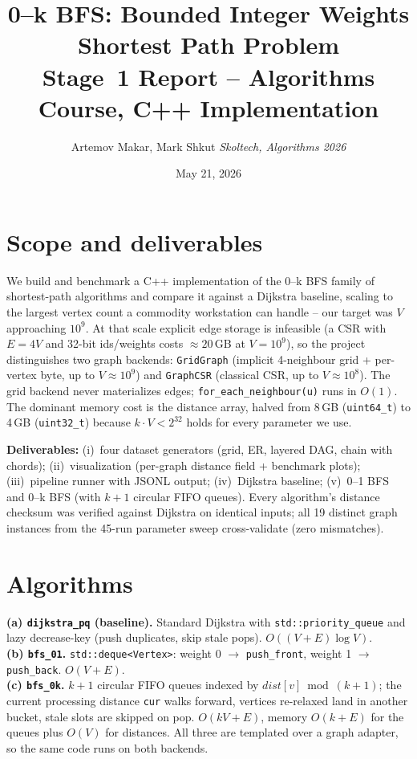\documentclass[11pt,a4paper]{article}
\title{\vspace{-2.3em}\textbf{0--k BFS: Bounded Integer Weights Shortest Path Problem}\\
\normalsize Stage~1 Report -- Algorithms Course, C++ Implementation}
\author{Artemov Makar, Mark Shkut \quad\textit{Skoltech, Algorithms 2026}}
\date{\vspace{-0.6em}May 21, 2026}
\begin{document}
\maketitle
\vspace{-2em}

\section{Scope and deliverables}

We build and benchmark a C++ implementation of the 0--k BFS family of
shortest-path algorithms and compare it against a Dijkstra baseline, scaling
to the largest vertex count a commodity workstation can handle -- our target
was $V$ approaching $10^9$. At that scale explicit edge storage is infeasible
(a CSR with $E=4V$ and 32-bit ids/weights costs $\approx 20$\,GB at $V=10^9$),
so the project distinguishes two graph backends: \texttt{GridGraph} (implicit
4-neighbour grid + per-vertex byte, up to $V \approx 10^9$) and
\texttt{GraphCSR} (classical CSR, up to $V \approx 10^8$). The grid backend
never materializes edges; \texttt{for\_each\_neighbour(u)} runs in $O(1)$.
The dominant memory cost is the distance array, halved from 8\,GB
(\texttt{uint64\_t}) to 4\,GB (\texttt{uint32\_t}) because $k\cdot V < 2^{32}$
holds for every parameter we use.

\textbf{Deliverables:} (i)~four dataset generators (grid, ER, layered DAG,
chain with chords); (ii)~visualization (per-graph distance field + benchmark
plots); (iii)~pipeline runner with JSONL output; (iv)~Dijkstra baseline;
(v)~0--1 BFS and 0--k BFS (with $k{+}1$ circular FIFO queues).
Every algorithm's distance checksum was verified against Dijkstra on
identical inputs; all 19 distinct graph instances from the 45-run parameter
sweep cross-validate (zero mismatches).

\section{Algorithms}

\textbf{(a) \texttt{dijkstra\_pq} (baseline).} Standard Dijkstra with
\texttt{std::priority\_queue} and lazy decrease-key (push duplicates, skip
stale pops). $O((V+E)\log V)$.\\
\textbf{(b) \texttt{bfs\_01}.} \texttt{std::deque<Vertex>}: weight 0
$\to$ \texttt{push\_front}, weight 1 $\to$ \texttt{push\_back}. $O(V+E)$.\\
\textbf{(c) \texttt{bfs\_0k}.} $k{+}1$ circular FIFO queues indexed by
$dist[v] \bmod (k{+}1)$; the current processing distance \texttt{cur} walks
forward, vertices re-relaxed land in another bucket, stale slots are skipped
on pop. $O(kV+E)$, memory $O(k+E)$ for the queues plus $O(V)$ for
distances. All three are templated over a graph adapter, so the same code
runs on both backends.
\end{document}
